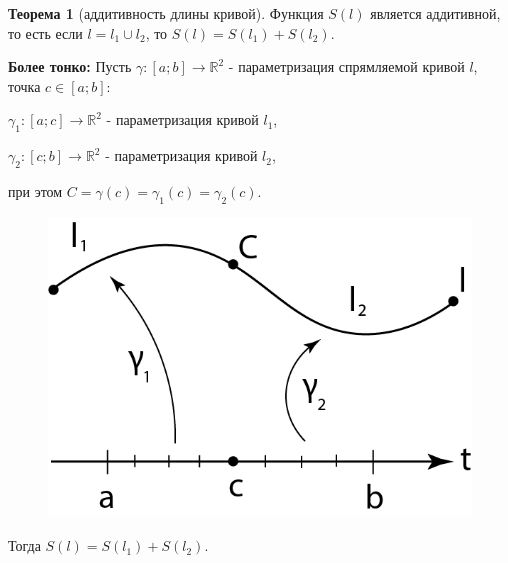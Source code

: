 \documentclass{report}
\theoremstyle{definition}
\newtheorem{theorem}{Теорема}[section]
\begin{document}
\begin{theorem}[аддитивность длины кривой]
  Функция $S(l)$ является аддитивной, то есть если $l = l_1 \cup l_2$, то $S(l) = S(l_1) + S(l_2)$.

  \textbf{Более тонко:} Пусть $\gamma:[a;b]\rightarrow\mathbb{R}^2$ - параметризация спрямляемой кривой
  $l$, точка $c \in [a;b]$:

  $\gamma_1:[a;c] \rightarrow \mathbb{R}^2$ - параметризация кривой $l_1$,

  $\gamma_2:[c;b] \rightarrow \mathbb{R}^2$ - параметризация кривой $l_2$,

  при этом $C = \gamma(c) = \gamma_1(c) = \gamma_2(c)$.
  \begin{figure}[H]
    \begin{center}
      \includegraphics[scale=0.2]{graph12.png}\label{figure12}
    \end{center}
  \end{figure}

  Тогда $S(l) = S(l_1) + S(l_2)$.
\end{theorem}
\end{document}
